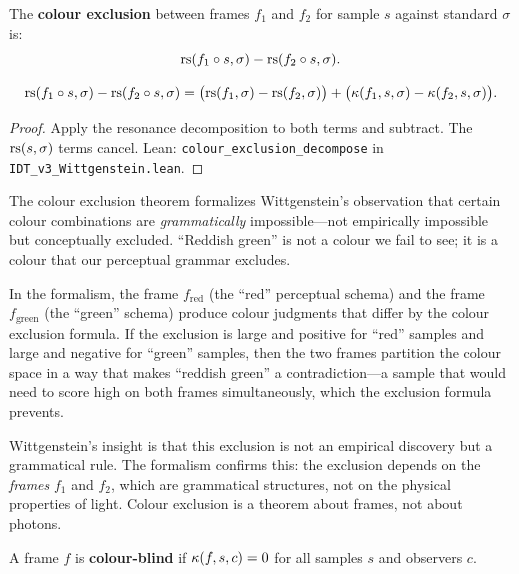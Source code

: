 \begin{definition}
\label{def:colour-exclusion}
The \textbf{colour exclusion} between frames $f_1$ and $f_2$ for sample $s$
against standard $\sigma$ is:
\[
\mathrm{rs}(f_1 \circ s, \sigma) - \mathrm{rs}(f_2 \circ s, \sigma).
\]
\end{definition}

\begin{theorem}
\label{thm:colour-exclusion}
\[
\mathrm{rs}(f_1 \circ s, \sigma) - \mathrm{rs}(f_2 \circ s, \sigma)
= \bigl(\mathrm{rs}(f_1, \sigma) - \mathrm{rs}(f_2, \sigma)\bigr)
+ \bigl(\kappa(f_1, s, \sigma) - \kappa(f_2, s, \sigma)\bigr).
\]
\end{theorem}

\begin{proof}
Apply the resonance decomposition to both terms and subtract. The
$\mathrm{rs}(s, \sigma)$ terms cancel.
Lean: \texttt{colour\_exclusion\_decompose} in
\texttt{IDT\_v3\_Wittgenstein.lean}.
\end{proof}

\begin{interpretation}
The colour exclusion theorem formalizes Wittgenstein's observation that certain
colour combinations are \emph{grammatically} impossible---not empirically
impossible but conceptually excluded. ``Reddish green'' is not a colour we fail
to see; it is a colour that our perceptual grammar excludes.

In the formalism, the frame $f_{\text{red}}$ (the ``red'' perceptual schema)
and the frame $f_{\text{green}}$ (the ``green'' schema) produce colour judgments
that differ by the colour exclusion formula. If the exclusion is large and
positive for ``red'' samples and large and negative for ``green'' samples, then
the two frames partition the colour space in a way that makes ``reddish green''
a contradiction---a sample that would need to score high on both frames
simultaneously, which the exclusion formula prevents.

Wittgenstein's insight is that this exclusion is not an empirical discovery but
a grammatical rule. The formalism confirms this: the exclusion depends on the
\emph{frames} $f_1$ and $f_2$, which are grammatical structures, not on the
physical properties of light. Colour exclusion is a theorem about frames, not
about photons.
\end{interpretation}

\begin{definition}
\label{def:colour-blind}
A frame $f$ is \textbf{colour-blind} if $\kappa(f, s, c) = 0$ for all
samples $s$ and observers $c$.
\end{definition}

